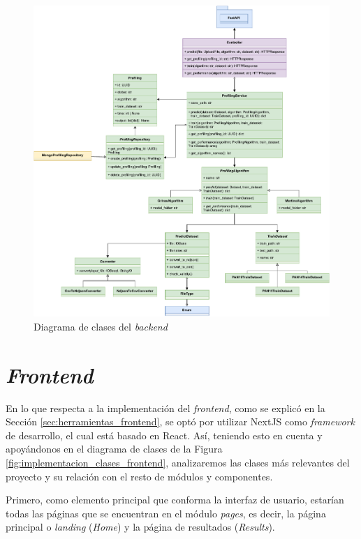 \bigskip
\begin{figure}[H]
	\centering
	\includegraphics[width=\textwidth]{diagramas/clases_back.pdf}
	\caption{Diagrama de clases del \textit{backend}}
	\label{fig:implementacion_clases_backend}
\end{figure}

\section{\textit{Frontend}}

En lo que respecta a la implementación del \textit{frontend}, como se explicó en la Sección \ref{sec:herramientas_frontend}, se optó
por utilizar NextJS como \textit{framework} de desarrollo, el cual está basado en React. Así, teniendo esto en cuenta y apoyándonos
en el diagrama de clases de la Figura \ref{fig:implementacion_clases_frontend}, analizaremos
las clases más relevantes del proyecto y su relación con el resto de módulos y componentes.

\bigskip
Primero, como elemento principal que conforma la interfaz de usuario, estarían todas las páginas que se encuentran en el módulo \textit{pages}, es decir,
la página principal o \textit{landing} (\textit{Home}) y la página de resultados (\textit{Results}).

